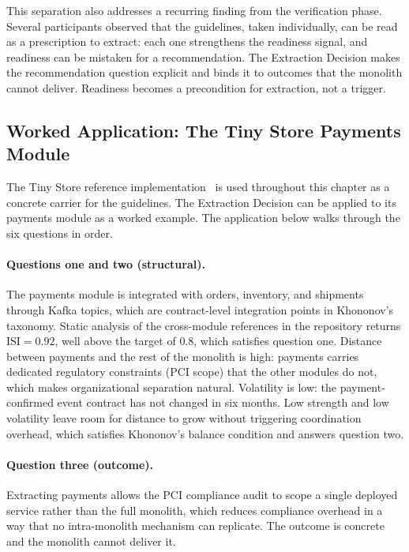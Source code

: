 This separation also addresses a recurring finding from the verification phase. Several participants observed that the guidelines, taken individually, can be read as a prescription to extract: each one strengthens the readiness signal, and readiness can be mistaken for a recommendation. The Extraction Decision makes the recommendation question explicit and binds it to outcomes that the monolith cannot deliver. Readiness becomes a precondition for extraction, not a trigger.

\subsection*{Worked Application: The Tiny Store Payments Module}

The Tiny Store reference implementation~\cite{tinystore2026} is used throughout this chapter as a concrete carrier for the guidelines. The Extraction Decision can be applied to its payments module as a worked example. The application below walks through the six questions in order.

\paragraph*{Questions one and two (structural).} The payments module is integrated with orders, inventory, and shipments through Kafka topics, which are contract-level integration points in Khononov's taxonomy. Static analysis of the cross-module references in the repository returns $\text{ISI} = 0.92$, well above the target of $0.8$, which satisfies question one. Distance between payments and the rest of the monolith is high: payments carries dedicated regulatory constraints (PCI scope) that the other modules do not, which makes organizational separation natural. Volatility is low: the payment-confirmed event contract has not changed in six months. Low strength and low volatility leave room for distance to grow without triggering coordination overhead, which satisfies Khononov's balance condition and answers question two.

\paragraph*{Question three (outcome).} Extracting payments allows the PCI compliance audit to scope a single deployed service rather than the full monolith, which reduces compliance overhead in a way that no intra-monolith mechanism can replicate. The outcome is concrete and the monolith cannot deliver it.

